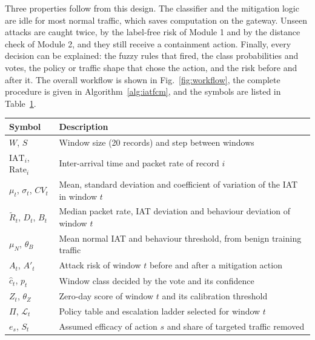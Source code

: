 \documentclass[]{interact}
\theoremstyle{plain}
\theoremstyle{definition}
\begin{document}
Three properties follow from this design. The classifier and the mitigation logic are idle for most normal traffic, which saves computation on the gateway. Unseen attacks are caught twice, by the label-free risk of Module 1 and by the distance check of Module 2, and they still receive a containment action. Finally, every decision can be explained: the fuzzy rules that fired, the class probabilities and votes, the policy or traffic shape that chose the action, and the risk before and after it. The overall workflow is shown in Fig.~\ref{fig:workflow}, the complete procedure is given in Algorithm~\ref{alg:iatfcm}, and the symbols are listed in Table~\ref{tab:symbols}.

\begin{table}[htbp]
{\small
\begin{tabular}{ll}
\toprule
Symbol & Description \\
\midrule
$W$, $S$ & Window size (20 records) and step between windows \\
$\mathrm{IAT}_i$, $\mathrm{Rate}_i$ & Inter-arrival time and packet rate of record $i$ \\
$\mu_t$, $\sigma_t$, $CV_t$ & Mean, standard deviation and coefficient of variation of the IAT in window $t$ \\
$\tilde{R}_t$, $D_t$, $B_t$ & Median packet rate, IAT deviation and behaviour deviation of window $t$ \\
$\mu_N$, $\theta_B$ & Mean normal IAT and behaviour threshold, from benign training traffic \\
$A_t$, $A'_t$ & Attack risk of window $t$ before and after a mitigation action \\
$\hat{c}_t$, $p_t$ & Window class decided by the vote and its confidence \\
$Z_t$, $\theta_Z$ & Zero-day score of window $t$ and its calibration threshold \\
$\Pi$, $\mathcal{L}_t$ & Policy table and escalation ladder selected for window $t$ \\
$e_s$, $S_t$ & Assumed efficacy of action $s$ and share of targeted traffic removed \\
\bottomrule
\end{tabular}}
\label{tab:symbols}
\end{table}
\end{document}
